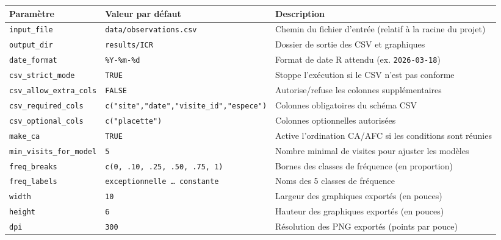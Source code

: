 {\def\LTcaptype{none} %
\begin{longtable}[]{@{}
  >{\raggedright\arraybackslash}p{}
  >{\raggedright\arraybackslash}p{}
  >{\raggedright\arraybackslash}p{}@{}}
\toprule\noalign{}
\begin{minipage}[b]{\linewidth}\raggedright
Paramètre
\end{minipage} & \begin{minipage}[b]{\linewidth}\raggedright
Valeur par défaut
\end{minipage} & \begin{minipage}[b]{\linewidth}\raggedright
Description
\end{minipage} \\
\midrule\noalign{}
\endhead
\bottomrule\noalign{}
\endlastfoot
\texttt{input\_file} & \texttt{data/observations.csv} & Chemin du
fichier d'entrée (relatif à la racine du projet) \\
\texttt{output\_dir} & \texttt{results/ICR} & Dossier de sortie des CSV
et graphiques \\
\texttt{date\_format} & \texttt{\%Y-\%m-\%d} & Format de date R attendu
(ex. \texttt{2026-03-18}) \\
\texttt{csv\_strict\_mode} & \texttt{TRUE} & Stoppe l'exécution si le
CSV n'est pas conforme \\
\texttt{csv\_allow\_extra\_cols} & \texttt{FALSE} & Autorise/refuse les
colonnes supplémentaires \\
\texttt{csv\_required\_cols} &
\texttt{c("site","date","visite\_id","espece")} & Colonnes obligatoires
du schéma CSV \\
\texttt{csv\_optional\_cols} & \texttt{c("placette")} & Colonnes
optionnelles autorisées \\
\texttt{make\_ca} & \texttt{TRUE} & Active l'ordination CA/AFC si les
conditions sont réunies \\
\texttt{min\_visits\_for\_model} & \texttt{5} & Nombre minimal de
visites pour ajuster les modèles \\
\texttt{freq\_breaks} & \texttt{c(0,\ .10,\ .25,\ .50,\ .75,\ 1)} &
Bornes des classes de fréquence (en proportion) \\
\texttt{freq\_labels} & \texttt{exceptionnelle\ …\ constante} & Noms des
5 classes de fréquence \\
\texttt{width} & \texttt{10} & Largeur des graphiques exportés (en
pouces) \\
\texttt{height} & \texttt{6} & Hauteur des graphiques exportés (en
pouces) \\
\texttt{dpi} & \texttt{300} & Résolution des PNG exportés (points par
pouce) \\
\end{longtable}
}

